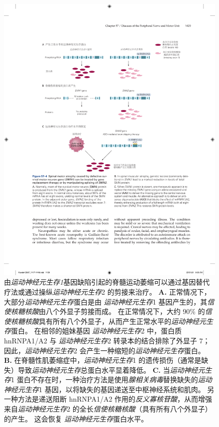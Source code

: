 \begin{figure}[htbp]
	\centering
	\includegraphics[width=0.8\linewidth]{chap57/fig_57_4}
	\caption{由\textit{运动神经元生存1}基因缺陷引起的脊髓运动萎缩可以通过基因替代疗法或通过操纵\textit{运动神经元生存}2 的剪接来治疗。
		\textbf{A.} 正常情况下，大部分\textit{运动神经元生存}蛋白是由 \textit{运动神经元生存}1 基因产生的，其\textit{信使核糖核酸}由八个外显子剪接而成。
		在正常情况下，大约 90\% 的\textit{信使核糖核酸}具有所有八个外显子，从而产生正常水平的\textit{运动神经元生存}蛋白。
		在相邻的姐妹基因 \textit{运动神经元生存}2 中，蛋白质 hnRNPA1/A2 与 \textit{运动神经元生存}2 转录本的结合排除了外显子 7；
		因此，\textit{运动神经元生存}2 会产生一种缩短的\textit{运动神经元生存}蛋白。
		\textbf{B.} 在脊髓性肌萎缩症中，\textit{运动神经元生存}1 的遗传损伤（通常是缺失）导致\textit{运动神经元生存}总蛋白水平显着降低。
		\textbf{C.} 当\textit{运动神经元生存}1 蛋白不存在时，一种治疗方法是使用\textit{腺相关病毒}替换缺失的\textit{运动神经元生存}1 基因，以将缺失的基因递送至中枢神经系统和肌肉。
		另一种方法是递送阻断 hnRNPA1/A2 作用的\textit{反义寡核苷酸}，从而增强来自\textit{运动神经元生存}2 的全长\textit{信使核糖核酸}（具有所有八个外显子）的产生。
		这会恢复 \textit{运动神经元生存}蛋白水平。}
	\label{fig:57_4}
\end{figure}



